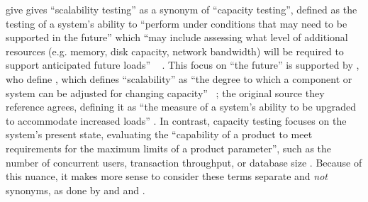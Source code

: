 \ifnotpaper \citeauthor{IEEE2021} give
\else \cite[p.~39]{IEEE2021} gives \fi ``scalability testing'' as a synonym
of ``capacity testing'', defined
as the testing of a system's ability to ``perform under conditions that may
need to be supported in the future'' which ``may include assessing what level
of additional resources (e.g. memory, disk capacity, network bandwidth) will
be required to support anticipated future loads''%
\ifnotpaper \ \citeyearpar[p.~39]{IEEE2021}%
\fi. This focus on ``the future'' is supported by
\ifnotpaper \citeauthor{ISTQB_author}, who define
\else \cite{ISTQB}, which defines
\fi ``scalability'' as ``the degree to which a component or system can be
adjusted for changing capacity''%
\ifnotpaper \ \citeyearpar{ISTQB}; the original source
      they reference agrees, defining it as ``the measure of a system's ability to be
      upgraded to accommodate increased loads'' \citep[p.~381]{GerrardAndThompson2002}%
\fi. In contrast, capacity testing focuses on the system's present state, evaluating
the ``capability of a product to meet requirements for the maximum limits of a
product parameter'', such as the number of concurrent users, transaction
throughput, or database size \citep{ISO_IEC2023a}. Because of this nuance, it
makes more sense to consider these terms separate and \emph{not} synonyms, as
done by
\ifnotpaper \citet[p.~53]{Firesmith2015} and \citet[pp.~22-23]{Bas2024}%
\else \cite[p.~53]{Firesmith2015} and \cite[pp.~22-23]{Bas2024}%
\fi.

